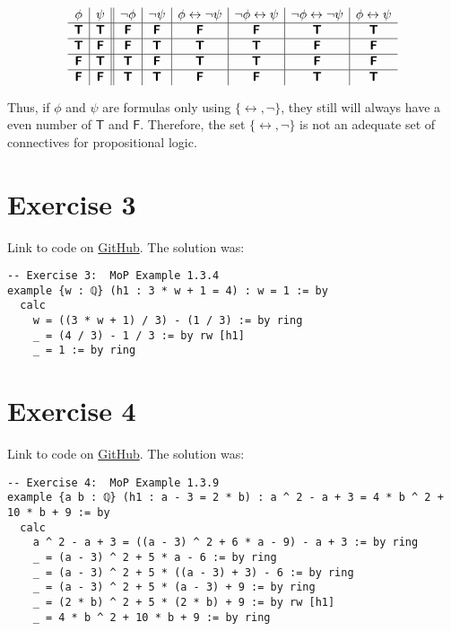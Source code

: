 \documentclass[11pt]{article}
\newcommand{\TTT}{\bm{\mathsf{T}}}
\newcommand{\FFF}{\bm{\mathsf{F}}}
\begin{document}
\[
\begin{array}{c | c || c | c | c | c | c | c}
    \phi & \psi & \neg{\phi} & \neg{\psi} & \phi \leftrightarrow \neg{\psi} & \neg{\phi} \leftrightarrow \psi & \neg{\phi} \leftrightarrow \neg{\psi} & \phi \leftrightarrow \psi \\ \hline
    \TTT & \TTT & \FFF & \FFF & \FFF & \FFF & \TTT & \TTT \\ \hline  
    \TTT & \FFF & \FFF & \TTT & \TTT & \TTT & \FFF & \FFF \\ \hline  
    \FFF & \TTT & \TTT & \FFF & \TTT & \TTT & \FFF & \FFF \\ \hline  
    \FFF & \FFF & \TTT & \TTT & \FFF & \FFF & \TTT & \TTT
\end{array}
\]

Thus, if $\phi$ and $\psi$ are formulas only using $\{\leftrightarrow, \neg\}$, they still will always have a even number of $\TTT$ and $\FFF$. Therefore, the set $\{\leftrightarrow, \neg\}$ is not an adequate set of connectives for propositional logic.

\newpage
\section*{Exercise 3}
Link to code on \href{https://github.com/lucastassis/BU-CS511/blob/main/HW01/code/HW01.lean}{GitHub}. The solution was:

\begin{lstlisting}
-- Exercise 3:  MoP Example 1.3.4
example {w : ℚ} (h1 : 3 * w + 1 = 4) : w = 1 := by
  calc
    w = ((3 * w + 1) / 3) - (1 / 3) := by ring
    _ = (4 / 3) - 1 / 3 := by rw [h1]
    _ = 1 := by ring
\end{lstlisting}

\section*{Exercise 4}
Link to code on \href{https://github.com/lucastassis/BU-CS511/blob/main/HW01/code/HW01.lean}{GitHub}. The solution was: 

\begin{lstlisting}
-- Exercise 4:  MoP Example 1.3.9
example {a b : ℚ} (h1 : a - 3 = 2 * b) : a ^ 2 - a + 3 = 4 * b ^ 2 + 10 * b + 9 := by
  calc
    a ^ 2 - a + 3 = ((a - 3) ^ 2 + 6 * a - 9) - a + 3 := by ring
    _ = (a - 3) ^ 2 + 5 * a - 6 := by ring
    _ = (a - 3) ^ 2 + 5 * ((a - 3) + 3) - 6 := by ring
    _ = (a - 3) ^ 2 + 5 * (a - 3) + 9 := by ring
    _ = (2 * b) ^ 2 + 5 * (2 * b) + 9 := by rw [h1]
    _ = 4 * b ^ 2 + 10 * b + 9 := by ring
\end{lstlisting}
\end{document}
